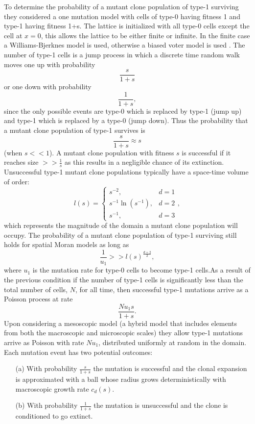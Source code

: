 \documentclass[\main/thesis.tex]{subfiles}
\begin{document}
To determine the probability of a mutant clone population of type-1 surviving they considered a one mutation model with cells of type-0 having fitness 1 and type-1 having fitness 1+s. The lattice is initialized with all type-0 cells except the cell at $x{=}0$, this allows the lattice to be either finite or infinite. In the finite case a Williams-Bjerknes model \cite{Williams} is used, otherwise a biased voter model is used \cite{Liggett}. The number of type-1 cells is a jump process in which a discrete time random walk moves one up with probability 
$$
\frac{s}{1{+}s}
$$ 
or one down with probability 
$$
\frac{1}{1{+}s},
$$ 
since the only possible events are type-0 which is replaced by type-1 (jump up) and type-1 which is replaced by a type-0 (jump down). Thus the probability that a mutant clone population of type-1 survives is 
$$
\frac{s}{1{+}s} \approx s
$$
(when $s << 1$). A mutant clone population with fitness $s$ is successful if it reaches size $>> \frac{1}{s}$ as this results in a negligible chance of its extinction. Unsuccessful type-1 mutant clone populations typically have a space-time volume of order:
$$
l(s) {=} \begin{cases}
            s^{-2}, & d{=}1 \\
            s^{-1}\ln(s^{-1}), & d{=}2 \\
            s^{-1}, & d{=} 3 
          \end{cases},
$$
which represents the magnitude of the domain a mutant clone population will occupy. The probability of a mutant clone population of type-1 surviving still holds for spatial Moran models as long as 
$$
\frac{1}{u_1} >> l(s)^{\frac{d{+}2}{2}},
$$
where $u_1$ is the mutation rate for type-0 cells to become type-1 cells.As a result of the previous condition if the number of type-1 cells is significantly less than the total number of cells, $N$, for all time, then successful type-1 mutations arrive as a Poisson process at rate 
$$
\frac{Nu_1s}{1{+}s}.
$$
Upon considering a mesoscopic model (a hybrid model that includes elements from both the macroscopic and microscopic scales) they allow type-1 mutations arrive as Poisson with rate $Nu_1$, distributed uniformly at random in the domain. Each mutation event has two potential outcomes:
\begin{itemize}
  \item[(a)] With probability $\frac{s}{1{+}s}$ the mutation is successful and 
             the clonal expansion is approximated with a ball whose radius grows 
             deterministically with macroscopic growth rate $c_d(s)$.
  \item[(b)] With probability $\frac{1}{1{+}s}$ the mutation is unsuccessful and 
             the clone is conditioned to go extinct.
\end{itemize}
\end{document}
